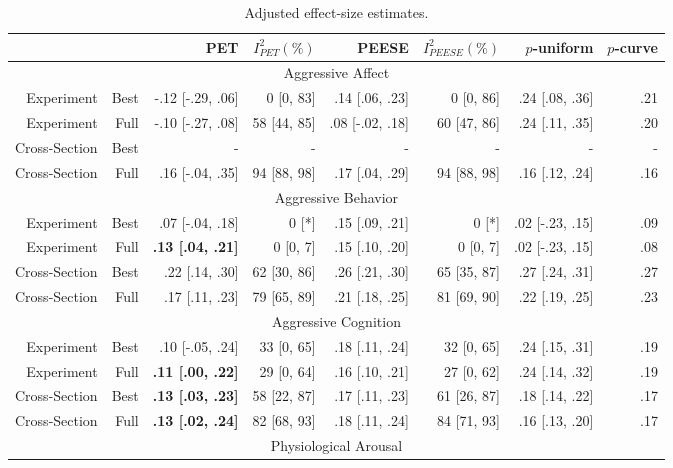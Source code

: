 \documentclass[man, mask]{apa6}
\begin{document}
\begin{table}[htbp]
	\centering
	\caption{Adjusted effect-size estimates.}
	    \begin{tabular}{rrrrrrrr}
	    	\toprule
	    	&       & PET   & $I^2_{PET} (\%)$ & PEESE & $I^2_{PEESE} (\%)$ & $p$-uniform & $p$-curve \\
	    	\midrule
	    	\multicolumn{8}{c}{Aggressive Affect} \\
	    	Experiment & Best  & -.12 [-.29, .06] & 0 [0, 83] & .14 [.06, .23] &  0 [0, 86] & .24 [.08, .36] & .21 \\
	    	Experiment & Full  & -.10 [-.27, .08] & 58 [44, 85] & .08 [-.02, .18] & 60 [47, 86] & .24 [.11, .35] & .20 \\
	    	Cross-Section & Best  & -     & -     & -     & -     & -     & - \\
	    	Cross-Section & Full  &  .16 [-.04, .35] & 94 [88, 98] & .17 [.04, .29] & 94 [88, 98] & .16 [.12, .24] & .16 \\
	    	\multicolumn{8}{c}{Aggressive Behavior} \\
	    	Experiment & Best  &  .07 [-.04, .18] &  0 [*] & .15 [.09, .21] &  0 [*] & .02 [-.23, .15] & .09 \\
	    	Experiment & Full  &  \textbf{.13 [.04, .21]} & 0 [0, 7] & .15 [.10, .20] & 0 [0, 7] & .02 [-.23, .15] & .08 \\
	    	Cross-Section & Best  &  .22 [.14, .30] & 62 [30, 86] & .26 [.21, .30] & 65 [35, 87] & .27 [.24, .31] & .27 \\
	    	Cross-Section & Full  &  .17 [.11, .23] & 79 [65, 89] & .21 [.18, .25] & 81 [69, 90] & .22 [.19, .25] & .23 \\
	    	\multicolumn{8}{c}{Aggressive Cognition} \\
	    	Experiment & Best  &  .10 [-.05, .24] & 33 [0, 65] & .18 [.11, .24] & 32 [0, 65] & .24 [.15, .31] & .19 \\
	    	Experiment & Full  &  \textbf{.11 [.00, .22]} & 29 [0, 64] & .16 [.10, .21] & 27 [0, 62] & .24 [.14, .32] & .19 \\
	    	Cross-Section & Best  &  \textbf{.13 [.03, .23]} & 58 [22, 87] & .17 [.11, .23] & 61 [26, 87] & .18 [.14, .22] & .17 \\
	    	Cross-Section & Full  &  \textbf{.13 [.02, .24]} & 82 [68, 93] & .18 [.11, .24] & 84 [71, 93] & .16 [.13, .20] & .17 \\
	    	\multicolumn{8}{c}{Physiological Arousal} \\

\end{tabular}
\end{table}
\end{document}
